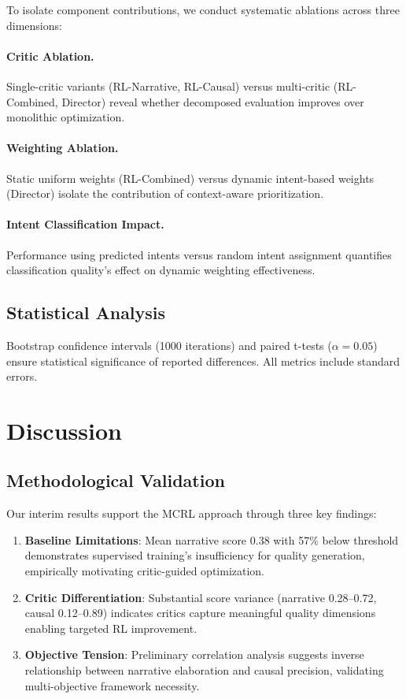 \documentclass[11pt]{article}
\begin{document}
To isolate component contributions, we conduct systematic ablations across three dimensions:

\paragraph{Critic Ablation.} Single-critic variants (RL-Narrative, RL-Causal) versus multi-critic (RL-Combined, Director) reveal whether decomposed evaluation improves over monolithic optimization.

\paragraph{Weighting Ablation.} Static uniform weights (RL-Combined) versus dynamic intent-based weights (Director) isolate the contribution of context-aware prioritization.

\paragraph{Intent Classification Impact.} Performance using predicted intents versus random intent assignment quantifies classification quality's effect on dynamic weighting effectiveness.

\subsection{Statistical Analysis}

Bootstrap confidence intervals (1000 iterations) and paired t-tests ($\alpha = 0.05$) ensure statistical significance of reported differences. All metrics include standard errors.


\section{Discussion}

\subsection{Methodological Validation}

Our interim results support the MCRL approach through three key findings:

\begin{enumerate}
    \item \textbf{Baseline Limitations}: Mean narrative score 0.38 with 57\% below threshold demonstrates supervised training's insufficiency for quality generation, empirically motivating critic-guided optimization.
    
    \item \textbf{Critic Differentiation}: Substantial score variance (narrative 0.28--0.72, causal 0.12--0.89) indicates critics capture meaningful quality dimensions enabling targeted RL improvement.
    
    \item \textbf{Objective Tension}: Preliminary correlation analysis suggests inverse relationship between narrative elaboration and causal precision, validating multi-objective framework necessity.
\end{enumerate}
\end{document}
